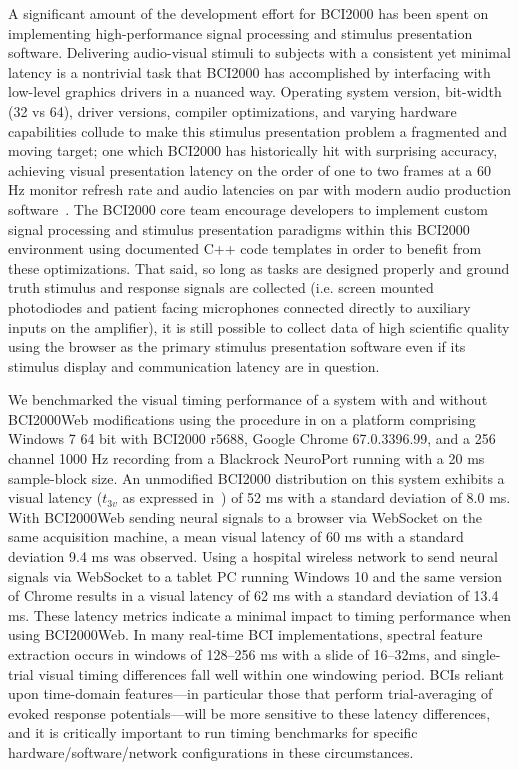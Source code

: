 \documentclass[utf8]{frontiersSCNS}
\begin{document}
A significant amount of the development effort for BCI2000 has been spent on implementing high-performance signal processing and stimulus presentation software.  Delivering audio-visual stimuli to subjects with a consistent yet minimal latency is a nontrivial task that BCI2000 has accomplished by interfacing with low-level graphics drivers in a nuanced way.  Operating system version, bit-width (32 vs 64), driver versions, compiler optimizations, and varying hardware capabilities collude to make this stimulus presentation problem a fragmented and moving target; one which BCI2000 has historically hit with surprising accuracy, achieving visual presentation latency on the order of one to two frames at a 60 Hz monitor refresh rate and audio latencies on par with modern audio production software~\citep{wilson_procedure_2010}. The BCI2000 core team encourage developers to implement custom signal processing and stimulus presentation paradigms within this BCI2000 environment using documented C++ code templates in order to benefit from these optimizations.  That said, so long as tasks are designed properly and ground truth stimulus and response signals are collected (i.e. screen mounted photodiodes and patient facing microphones connected directly to auxiliary inputs on the amplifier), it is still possible to collect data of high scientific quality using the browser as the primary stimulus presentation software even if its stimulus display and communication latency are in question.

We benchmarked the visual timing performance of a system with and without BCI2000Web modifications using the  procedure in \citep{wilson_procedure_2010} on a platform comprising Windows 7 64 bit with BCI2000 r5688, Google Chrome 67.0.3396.99, and a 256 channel 1000 Hz recording from a Blackrock NeuroPort running with a 20 ms sample-block size. An unmodified BCI2000 distribution on this system exhibits a visual latency ($t_{3v}$ as expressed in~\citep{wilson_procedure_2010}) of 52 ms with a standard deviation of 8.0 ms.  With BCI2000Web sending neural signals to a browser via WebSocket on the same acquisition machine, a mean visual latency of 60 ms with a standard deviation 9.4 ms was observed. Using a hospital wireless network to send neural signals via WebSocket to a tablet PC running Windows 10 and the same version of Chrome results in a visual latency of 62 ms with a standard deviation of 13.4 ms.  These latency metrics indicate a minimal impact to timing performance when using BCI2000Web.  In many real-time BCI implementations, spectral feature extraction occurs in windows of 128--256 ms with a slide of 16--32ms, and single-trial visual timing differences fall well within one windowing period.  BCIs reliant upon time-domain features---in particular those that perform trial-averaging of evoked response potentials---will be more sensitive to these latency differences, and it is critically important to run timing benchmarks for specific hardware/software/network configurations in these circumstances.
\end{document}
